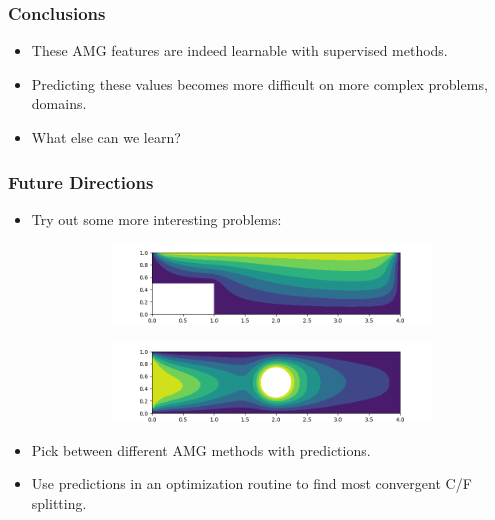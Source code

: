 \documentclass[handout]{beamer}
\begin{document}


\begin{frame}
  \frametitle{Conclusions}
  \begin{itemize}
  \item These AMG features are indeed learnable with supervised methods.
  \item Predicting these values becomes more difficult on more complex problems, domains.
  \item What else can we learn?
  \end{itemize}
\end{frame}

\begin{frame}
  \frametitle{Future Directions}
  \begin{itemize}
  \item Try out some more interesting problems:
  \begin{figure}[h]
  \centering
  \begin{subfigure}{.70\textwidth}
    \includegraphics[width=\textwidth]{figures/cd_bfs.png}
  \end{subfigure}
  \begin{subfigure}{.70\textwidth}
    \includegraphics[width=\textwidth]{figures/cd_cyl.png}
  \end{subfigure}
  \end{figure}
  \item Pick between different AMG methods with predictions.
  \item Use predictions in an optimization routine to find most convergent C/F splitting.
  \end{itemize}
\end{frame}
\end{document}
